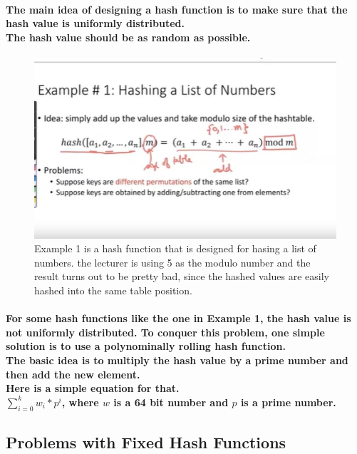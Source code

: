 \documentclass{article}
\begin{document}
\paragraph{The main idea of designing a hash function is to make sure 
that the hash value is uniformly distributed.\\
The hash value should be as random as possible.\\}

\begin{figure}[H]
    \includegraphics[width=\textwidth]{hashingexample1.png}
    \caption{Example 1 is a hash function that is designed for hasing a list of numbers.
    the lecturer is using 5 as the modulo number and the result turns out to be pretty bad,
    since the hashed values are easily hashed into the same table position.\\}
\end{figure}

\paragraph{For some hash functions like the one in Example 1, 
the hash value is not uniformly distributed. To conquer this problem,
one simple solution is to use a polynominally rolling hash function.\\
The basic idea is to multiply the hash value by a prime number 
and then add the new element. \\
Here is a simple equation for that.\\
$\sum_{i=0}^{k} w_i*p^i$, where $w$ is a 64 bit number and $p$ is a prime number.\\}

\subsection{Problems with Fixed Hash Functions}
\end{document}
